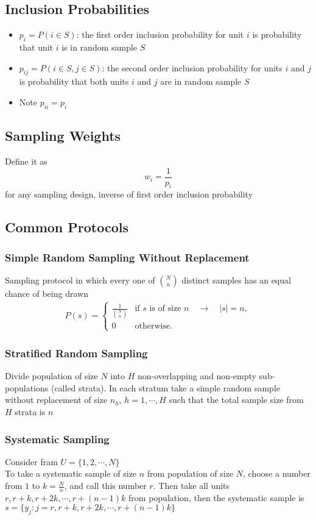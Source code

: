 \documentclass[11pt]{article}
\begin{document}
\subsection{Inclusion Probabilities}
\begin{itemize}
    \item 
    $p_i=P(i\in S)$: the first order inclusion probability for unit $i$ is probability that unit $i$ is in random sample $S$
    \item 
    $p_{ij}=P(i\in S, j\in S)$: the second order inclusion probability for units $i$ and $j$ is probability that both units $i$ and $j$ are in random sample $S$
    \item 
    Note $p_{ii}=p_i$
\end{itemize}
\subsection{Sampling Weights}
Define it as \[w_i=\frac{1}{p_i}\] for any sampling design, inverse of first order inclusion probability 
\subsection{Common Protocols}
\subsubsection{Simple Random Sampling Without Replacement}
Sampling protocol in which every one of $N\choose n$ distinct 
samples has an equal chance of being drawn
\begin{align*}
    P(s) = 
    \begin{cases}
        \frac{1}{{N \choose n}} & \text{if $s$ is of size $n$} \quad \rightarrow \quad |s| = n, \\
        0 & \text{otherwise}.
    \end{cases}
\end{align*}
\subsubsection{Stratified Random Sampling}
Divide population of size $N$ into $H$ non-overlapping and non-empty sub-populations (called strata).
In each stratum take a simple random sample without replacement of size $n_h$, $h=1,\cdots,H$
such that the total sample size from $H$ strata is $n$
\subsubsection{Systematic Sampling}
Consider fram $U=\{1,2,\cdots,N\}$ \\
To take a systematic sample of size $n$ from population of size $N$, choose a number from $1$ to 
$k=\frac{N}{n}$, and call this number $r$. Then take all units $r,r+k,r+2k,\cdots,r+(n-1)k$ from population,
then the systematic sample is $s=\{y_j:j=r,r+k,r+2k,\cdots,r+(n-1)k\}$
\end{document}
